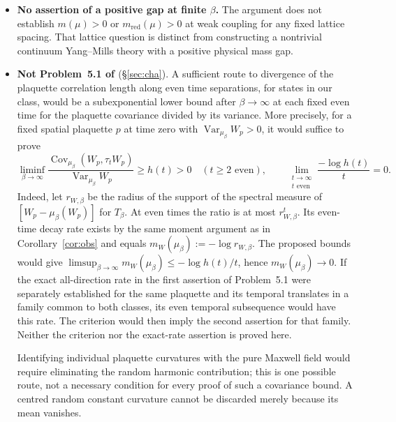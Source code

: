 \documentclass[11pt,a4paper]{article}
\theoremstyle{plain}
\theoremstyle{definition}
\theoremstyle{remark}
\numberwithin{equation}{section}
\newcommand{\Var}{\operatorname{Var}}
\newcommand{\Cov}{\operatorname{Cov}}
\begin{document}
\begin{itemize}
The exponent $1/120$ is not claimed to be optimal for the method (Remark~\ref{rem:exponent}). The constants of the earlier fixed-box estimates (for instance $c_0$ in \S\ref{sec:S}) are still not effective; Theorem~\ref{thm:rate} does not use them.
\item \textbf{No assertion of a positive gap at finite $\beta$.}
The argument does not establish $m(\mu)>0$ or $m_{\mathrm{red}}(\mu)>0$ at weak coupling for any fixed lattice spacing.
That lattice question is distinct from constructing a nontrivial continuum Yang--Mills theory with a positive physical mass gap.
\item \textbf{Not Problem~5.1 of \cite{Cha18}} (\S\ref{sec:cha}).
A sufficient route to divergence of the plaquette correlation length along even time separations, for states in our class, would be a
subexponential lower bound after $\beta\to\infty$ at each fixed even time for the plaquette covariance divided by its variance.
More precisely, for a fixed spatial plaquette $p$ at time zero with $\Var_{\mu_\beta}W_p>0$, it would suffice to prove
\[
\liminf_{\beta\to\infty}
\frac{\Cov_{\mu_\beta}(W_p,\tau_tW_p)}{\Var_{\mu_\beta}W_p}\ge h(t)>0
\quad(t\ge2\text{ even}),\qquad
\lim_{\substack{t\to\infty\\t\text{ even}}}\frac{-\log h(t)}t=0.
\]
Indeed, let $r_{W,\beta}$ be the radius of the support of the spectral measure of $[W_p-\mu_\beta(W_p)]$ for $T_\beta$.
At even times the ratio is at most $r_{W,\beta}^t$. Its even-time decay rate exists by the same moment argument as in
Corollary~\ref{cor:obs} and equals $m_W(\mu_\beta):=-\log r_{W,\beta}$.
The proposed bounds would give $\limsup_{\beta\to\infty}m_W(\mu_\beta)\le-\log h(t)/t$, hence $m_W(\mu_\beta)\to0$.
If the exact all-direction rate in the first assertion of Problem~5.1 were separately established for the same plaquette and its
temporal translates in a family common to both classes, its even temporal subsequence would have this rate. The criterion would then
imply the second assertion for that family. Neither the criterion nor the exact-rate assertion is proved here.

Identifying individual plaquette curvatures with the pure Maxwell field would require eliminating the random harmonic contribution;
this is one possible route, not a necessary condition for every proof of such a covariance bound. A centred random constant curvature
cannot be discarded merely because its mean vanishes.


\end{itemize}
\end{document}
